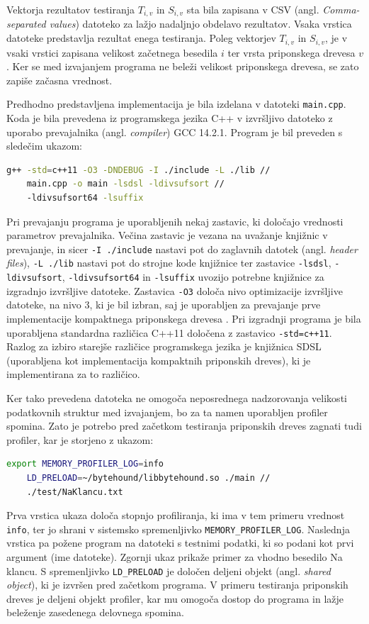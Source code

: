 Vektorja rezultatov testiranja $T_{i,v}$ in $S_{i,v}$ sta bila zapisana v CSV (angl. \textit{Comma-separated values}) datoteko za lažjo nadaljnjo obdelavo rezultatov. Vsaka vrstica datoteke predstavlja rezultat enega testiranja. Poleg vektorjev  $T_{i,v}$ in $S_{i,v}$, je v vsaki vrstici zapisana velikost začetnega besedila $i$ ter vrsta priponskega drevesa $v$. Ker se med izvajanjem programa ne beleži velikost priponskega drevesa, se zato zapiše začasna vrednost.

Predhodno predstavljena implementacija je bila izdelana v datoteki \verb|main.cpp|. Koda je bila prevedena iz programskega jezika C++ v izvršljivo datoteko z uporabo prevajalnika (angl. \textit{compiler}) GCC 14.2.1. Program je bil preveden s sledečim ukazom:
\begin{lstlisting}[language=bash]
    g++ -std=c++11 -O3 -DNDEBUG -I ./include -L ./lib // 
    main.cpp -o main -lsdsl -ldivsufsort //
    -ldivsufsort64 -lsuffix
\end{lstlisting}
Pri prevajanju programa je uporabljenih nekaj zastavic, ki določajo vrednosti parametrov prevajalnika. Večina zastavic je vezana na uvažanje knjižnic v prevajanje, in sicer \verb|-I ./include| nastavi pot do zaglavnih datotek (angl. \textit{header files}), \verb|-L ./lib| nastavi pot do strojne kode knjižnice ter zastavice \verb|-lsdsl|, \verb|-ldivsufsort|, \verb|-ldivsufsort64| in \verb|-lsuffix| uvozijo potrebne knjižnice za izgradnjo izvršljive datoteke.
Zastavica \verb|-O3| določa nivo optimizacije izvršljive datoteke, na nivo 3, ki je bil izbran, saj je uporabljen za prevajanje prve implementacije kompaktnega priponskega drevesa \cite{Valimaki2007}.
Pri izgradnji programa je bila uporabljena standardna različica C++11 določena z zastavico \verb|-std=c++11|. Razlog za izbiro starejše različice programskega jezika je knjižnica SDSL \cite{gbmp2014sea} (uporabljena kot implementacija kompaktnih priponskih dreves), ki je implementirana za to različico. 

Ker tako prevedena datoteka ne omogoča neposrednega nadzorovanja velikosti podatkovnih struktur med izvajanjem, bo za ta namen uporabljen profiler spomina. Zato je potrebo pred začetkom testiranja priponskih dreves zagnati tudi profiler, kar je storjeno z ukazom:
\begin{lstlisting}[language=bash]
    export MEMORY_PROFILER_LOG=info
    LD_PRELOAD=~/bytehound/libbytehound.so ./main // 
    ./test/NaKlancu.txt 
\end{lstlisting}
Prva vrstica ukaza določa stopnjo profiliranja, ki ima v tem primeru vrednost \verb|info|, ter jo shrani v sistemsko spremenljivko \verb|MEMORY_PROFILER_LOG|. Naslednja vrstica pa požene program na datoteki s testnimi podatki, ki so podani kot prvi argument (ime datoteke). Zgornji ukaz prikaže primer za vhodno besedilo Na klancu. S spremenljivko \verb|LD_PRELOAD| je določen deljeni objekt (angl. \textit{shared object}), ki je izvršen pred začetkom programa. V primeru testiranja priponskih dreves je deljeni objekt profiler, kar mu omogoča dostop do programa in lažje beleženje zasedenega delovnega spomina.

